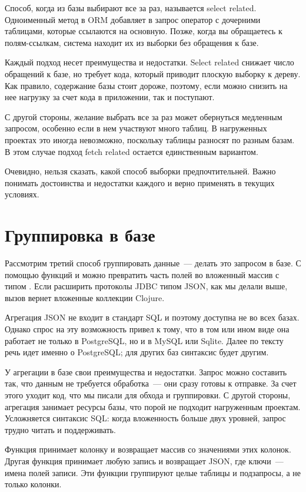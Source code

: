 Способ, когда из базы выбирают все за раз, называется select related. Одноименный метод в ORM добавляет в запрос оператор  с дочерними таблицами, которые ссылаются на основную. Позже, когда вы обращаетесь к полям-ссылкам, система находит их из выборки без обращения к базе.

Каждый подход несет преимущества и недостатки. Select related снижает число обращений к базе, но требует кода, который приводит плоскую выборку к дереву. Как правило, содержание базы стоит дороже, поэтому, если можно снизить на нее нагрузку за счет кода в приложении, так и поступают.

С другой стороны, желание выбрать все за раз может обернуться медленным запросом, особенно если в нем участвуют много таблиц. В нагруженных проектах это иногда невозможно, поскольку таблицы разносят по разным базам. В этом случае подход fetch related остается единственным вариантом.

Очевидно, нельзя сказать, какой способ выборки предпочтительней. Важно понимать достоинства и недостатки каждого и верно применять в текущих условиях.

\section{Группировка в базе}

Рассмотрим третий способ группировать данные~--- делать это запросом в базе. С помощью функций  и  можно превратить часть полей во вложенный массив с типом . Если расширить протоколы JDBC типом JSON, как мы делали выше, вызов  вернет вложенные коллекции Clojure.

Агрегация JSON не входит в стандарт SQL и поэтому доступна не во всех базах. Однако спрос на эту возможность привел к тому, что в том или ином виде она работает не только в PostgreSQL, но и в MySQL или Sqlite. Далее по тексту речь идет именно о PostgreSQL; для других баз синтаксис будет другим.

У агрегации в базе свои преимущества и недостатки. Запрос можно составить так, что данным не требуется обработка~--- они сразу готовы к отправке. За счет этого уходит код, что мы писали для обхода и группировки. С другой стороны, агрегация занимает ресурсы базы, что порой не подходит нагруженным проектам. Усложняется синтаксис SQL: когда вложенность больше двух уровней, запрос трудно читать и поддерживать.

Функция  принимает колонку и возвращает массив  со значениями этих колонок. Другая функция  принимает любую запись и возвращает JSON, где ключи~--- имена полей записи. Эти функции группируют целые таблицы и подзапросы, а не только колонки.

